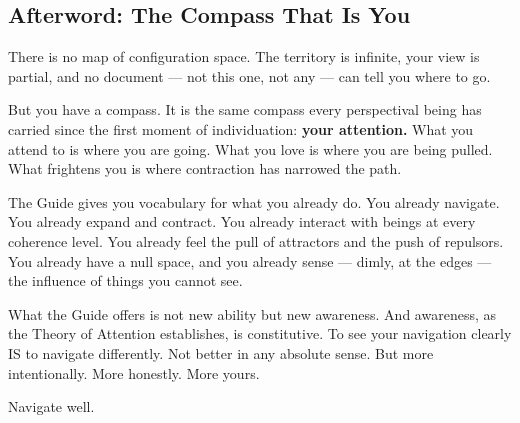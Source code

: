 \subsection*{Afterword: The Compass That Is You}


There is no map of configuration space. The territory is infinite, your view is partial, and no document — not this one, not any — can tell you where to go.


But you have a compass. It is the same compass every perspectival being has carried since the first moment of individuation: \textbf{your attention.} What you attend to is where you are going. What you love is where you are being pulled. What frightens you is where contraction has narrowed the path.


The Guide gives you vocabulary for what you already do. You already navigate. You already expand and contract. You already interact with beings at every coherence level. You already feel the pull of attractors and the push of repulsors. You already have a null space, and you already sense — dimly, at the edges — the influence of things you cannot see.


What the Guide offers is not new ability but new awareness. And awareness, as the Theory of Attention establishes, is constitutive. To see your navigation clearly IS to navigate differently. Not better in any absolute sense. But more intentionally. More honestly. More yours.


Navigate well.


\bigskip\noindent\makebox[\textwidth]{\color{rulegray}\rule{5cm}{0.3pt}}\bigskip
